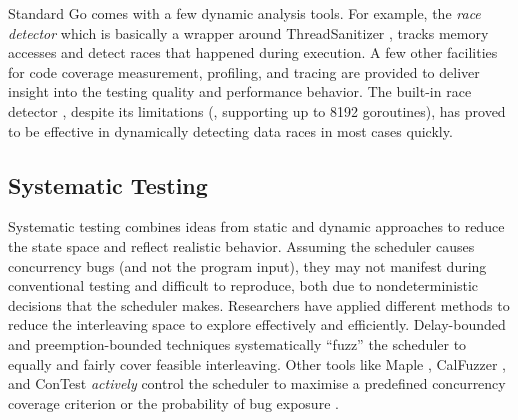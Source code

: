 Standard Go comes with a few dynamic analysis tools. For example, the \textit{race detector} \cite{go-race-blog} which is basically a wrapper around ThreadSanitizer \cite{konstantin-tsan-wbia09}, tracks memory accesses and detect races that happened during execution.
%
A few other facilities for code coverage measurement, profiling, and tracing \cite{go-package-trace} are provided to deliver insight into the testing quality and performance behavior.
%
The built-in race detector \cite{go-race-blog}, despite its limitations (\eg, supporting up to 8192 goroutines), has proved to be effective in dynamically detecting data races in most cases quickly.

\subsection{Systematic Testing}
Systematic testing combines ideas from static and dynamic approaches to reduce the state space and reflect realistic behavior.
%
Assuming the scheduler causes concurrency bugs (and not the program input), they may not manifest during conventional testing and difficult to reproduce, both due to nondeterministic decisions that the scheduler makes.
%
Researchers have applied different methods \cite{thomson-concurrencyTesting-ppopp14} to reduce the interleaving space to explore effectively and efficiently.
%
Delay-bounded \cite{emmi-delayBounded-popl11,burckhardt-depthBug-asplos10} and preemption-bounded \cite{madanlal-preemptionBound-pldi07} techniques systematically ``fuzz'' the scheduler to equally and fairly cover feasible interleaving.
%
Other tools like Maple \cite{yu-maple-oopsla12}, CalFuzzer \cite{joshi-calfuzzer},  and ConTest \cite{contest-jgi01,edelstein2003contest} \textit{actively} control the scheduler to maximise a predefined concurrency coverage criterion \cite{hong-syncTesting-issta12} or the probability of bug exposure \cite{burckhardt-depthBug-asplos10}.
